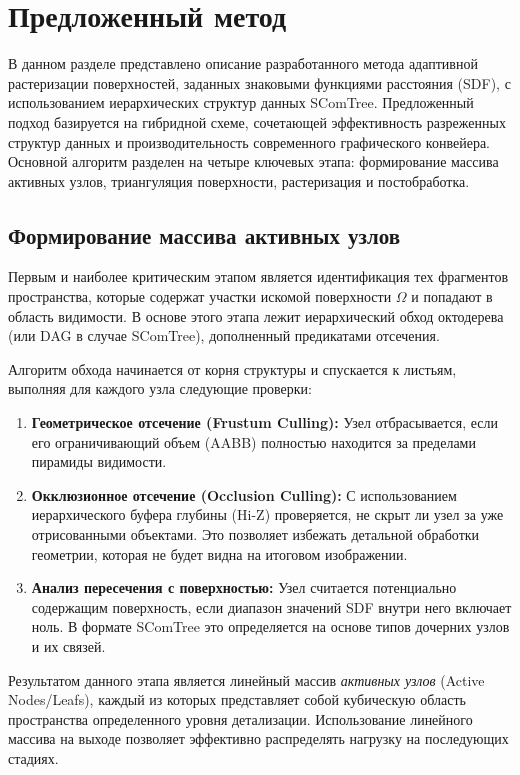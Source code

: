 \section{Предложенный метод}
\label{sec:proposed_method}

В данном разделе представлено описание разработанного метода адаптивной растеризации поверхностей, заданных знаковыми функциями расстояния (SDF), с использованием иерархических структур данных SComTree. Предложенный подход базируется на гибридной схеме, сочетающей эффективность разреженных структур данных и производительность современного графического конвейера. Основной алгоритм разделен на четыре ключевых этапа: формирование массива активных узлов, триангуляция поверхности, растеризация и постобработка.

\subsection{Формирование массива активных узлов}

Первым и наиболее критическим этапом является идентификация тех фрагментов пространства, которые содержат участки искомой поверхности $\Omega$ и попадают в область видимости. В основе этого этапа лежит иерархический обход октодерева (или DAG в случае SComTree), дополненный предикатами отсечения.

Алгоритм обхода начинается от корня структуры и спускается к листьям, выполняя для каждого узла следующие проверки:
\begin{enumerate}
    \item \textbf{Геометрическое отсечение (Frustum Culling):} Узел отбрасывается, если его ограничивающий объем (AABB) полностью находится за пределами пирамиды видимости.
    \item \textbf{Окклюзионное отсечение (Occlusion Culling):} С использованием иерархического буфера глубины (Hi-Z) проверяется, не скрыт ли узел за уже отрисованными объектами. Это позволяет избежать детальной обработки геометрии, которая не будет видна на итоговом изображении.
    \item \textbf{Анализ пересечения с поверхностью:} Узел считается потенциально содержащим поверхность, если диапазон значений SDF внутри него включает ноль. В формате SComTree это определяется на основе типов дочерних узлов и их связей.
\end{enumerate}

Результатом данного этапа является линейный массив \textit{активных узлов} (Active Nodes/Leafs), каждый из которых представляет собой кубическую область пространства определенного уровня детализации. Использование линейного массива на выходе позволяет эффективно распределять нагрузку на последующих стадиях.

